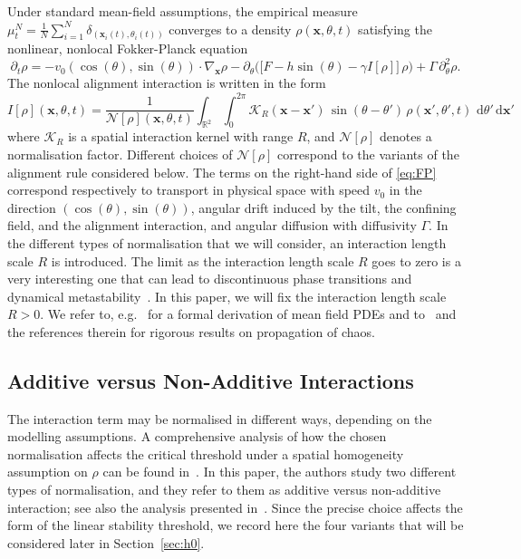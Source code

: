 \documentclass[a4paper,11pt]{article}
\theoremstyle{plain}
\theoremstyle{definition}
\theoremstyle{remark}
\newcommand{\R}{\mathbb{R}}
\newcommand{\dd}{\,\mathrm{d}}
\newcommand{\bx}{\mathbf{x}}
\newcommand{\cKr}{\mathcal{K}_R}
\begin{document}
Under standard mean-field assumptions, the empirical measure $\mu_t^N = \frac{1}{N}\sum_{i=1}^N \delta_{(\bx_i(t),\theta_i(t))}$ converges to a density $\rho(\bx,\theta,t)$ satisfying the nonlinear, nonlocal Fokker-Planck equation
\begin{equation}\label{eq:FP}
    \partial_t \rho = -v_0(\cos(\theta), \sin(\theta))\cdot\nabla_{\bx} \rho
    -\partial_\theta \Big( \big[F - h\sin(\theta) - \gamma I[\rho]\big]\,\rho\Big)
    + \Gamma\,\partial_\theta^2 \rho.
\end{equation}
The nonlocal alignment interaction is written in the form
\begin{equation}
    I[\rho](\bx,\theta,t)
    =
    \frac{1}{\mathcal N[\rho](\bx,\theta,t)}
    \int_{\R^2}\!\!\int_0^{2\pi}
    \cKr(\bx-\bx')\,\sin(\theta-\theta')\,\rho(\bx',\theta',t)
    \,\dd\theta'\dd\bx'
\end{equation}
where $\cKr$ is a spatial interaction kernel with range $R$, and $\mathcal N[\rho]$ denotes a normalisation factor. Different choices of $\mathcal N[\rho]$ correspond to the variants of the alignment rule considered below.
The terms on the right-hand side of \eqref{eq:FP} correspond respectively to transport in physical space with speed $v_0$ in the direction $(\cos(\theta),\sin(\theta))$, angular drift induced by the tilt, the confining field, and the alignment interaction, and angular diffusion with diffusivity $\Gamma$.  In the different types of normalisation that we will consider, an interaction length scale $R$ is introduced. The limit as the interaction length scale $R$ goes to zero is a very interesting one that can lead to discontinuous phase transitions and dynamical metastability~\cite{leimkuhler2025clusterformationdiffusivesystems, gerber2025formationclusterscoarseningweakly}. In this paper, we will fix the interaction length scale $R > 0$.
We refer to, e.g.~\cite{MartzelAslangul2001, peruani2008mean} for a formal derivation of mean field PDEs and to~\cite{chaintron2022propagationI, chaintron2022propagationII} and the references therein for rigorous results on propagation of chaos.

\subsection{Additive versus Non-Additive Interactions}\label{subsec:normalisations}
The interaction term may be normalised in different ways, depending on the modelling assumptions. A comprehensive analysis of how the chosen normalisation affects the critical threshold under a spatial homogeneity assumption on $\rho$ can be found in~\cite{chepizhko2021revisiting}. In this paper, the authors study two different types of normalisation, and they refer to them as additive versus non-additive interaction; see also the analysis presented in~\cite{Barre_2020}.  Since the precise choice affects the form of the linear stability threshold, we record here the four variants that will be considered later in Section~\ref{sec:h0}.
\end{document}
